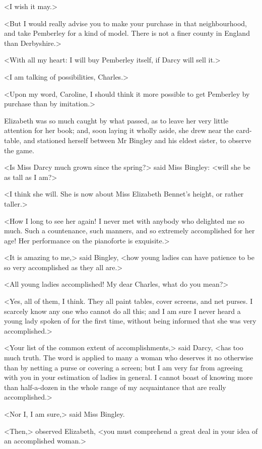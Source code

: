 <I wish it may.>

<But I would really advise you to make your purchase in that neighbourhood, and take Pemberley for a kind of model. There is not a finer county in England than Derbyshire.>

<With all my heart: I will buy Pemberley itself, if Darcy will sell it.>

<I am talking of possibilities, Charles.>

<Upon my word, Caroline, I should think it more possible to get Pemberley by purchase than by imitation.>

Elizabeth was so much caught by what passed, as to leave her very little attention for her book; and, soon laying it wholly aside, she drew near the card-table, and stationed herself between Mr Bingley and his eldest sister, to observe the game.

<Is Miss Darcy much grown since the spring?> said Miss Bingley: <will she be as tall as I am?>

<I think she will. She is now about Miss Elizabeth Bennet's height, or rather taller.>

<How I long to see her again! I never met with anybody who delighted me so much. Such a countenance, such manners, and so extremely accomplished for her age! Her performance on the pianoforte is exquisite.>

<It is amazing to me,> said Bingley, <how young ladies can have patience to be so very accomplished as they all are.>

<All young ladies accomplished! My dear Charles, what do you mean?>

<Yes, all of them, I think. They all paint tables, cover screens, and net purses. I scarcely know any one who cannot do all this; and I am sure I never heard a young lady spoken of for the first time, without being informed that she was very accomplished.>

<Your list of the common extent of accomplishments,> said Darcy, <has too much truth. The word is applied to many a woman who deserves it no otherwise than by netting a purse or covering a screen; but I am very far from agreeing with you in your estimation of ladies in general. I cannot boast of knowing more than half-a-dozen in the whole range of my acquaintance that are really accomplished.>



<Nor I, I am sure,> said Miss Bingley.

<Then,> observed Elizabeth, <you must comprehend a great deal in your idea of an accomplished woman.>

